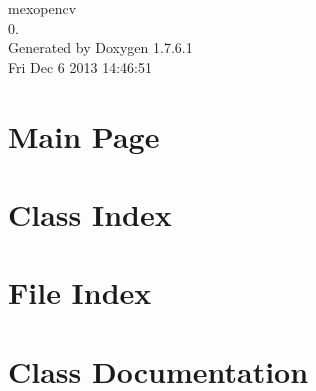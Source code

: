\documentclass[a4paper]{book}
\begin{document}
\hypersetup{pageanchor=false,citecolor=blue}
\begin{titlepage}
\vspace*{7cm}
\begin{center}
{\Large mexopencv \\[1ex]\large 0. }\\
\vspace*{1cm}
{\large \-Generated by Doxygen 1.7.6.1}\\
\vspace*{0.5cm}
{\small Fri Dec 6 2013 14:46:51}\\
\end{center}
\end{titlepage}
\clearemptydoublepage
{}
\tableofcontents
\clearemptydoublepage
{}
\hypersetup{pageanchor=true,citecolor=blue}
\chapter{\-Main \-Page}
\label{index}\hypertarget{index}{}
\chapter{\-Class \-Index}

\chapter{\-File \-Index}

\chapter{\-Class \-Documentation}


\end{document}
